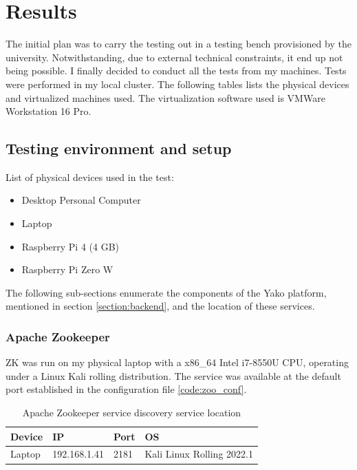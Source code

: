 \section{Results}
    The initial plan was to carry the testing out in a testing bench provisioned by the university. Notwithstanding, due to external technical constraints, it end up not being possible. I finally decided to conduct all the tests from my machines.
    Tests were performed in my local cluster. The following tables lists the physical devices and virtualized machines used. The virtualization software used is VMWare Workstation 16 Pro.
    
    \subsection{Testing environment and setup}
        List of physical devices used in the test:
        
        \begin{itemize}
            \item Desktop Personal Computer
            \item Laptop
            \item Raspberry Pi 4 (4 GB)
            \item Raspberry Pi Zero W
        \end{itemize}
        
        The following sub-sections enumerate the components of the Yako platform, mentioned in section \ref{section:backend}, and the location of these services.
        
        \subsubsection{Apache Zookeeper}
            ZK was run on my physical laptop with a x86\_64 Intel i7-8550U CPU, operating under a Linux Kali rolling distribution. The service was available at the default port established in the configuration file \ref{code:zoo_conf}.
            
            \begin{table}[H]
                \centering
                \caption{Apache Zookeeper service discovery service location}
                \label{tab:test_zk}
                \begin{tabular}{|l|l|l|l|}
                    \hline
                    \rowcolor[HTML]{C0C0C0}
                    \textbf{Device} & \textbf{IP}  & \textbf{Port} & \textbf{OS} \\\hline
                    Laptop & 192.168.1.41 & 2181 & Kali Linux Rolling 2022.1 \\ \hline
                \end{tabular}
            \end{table}
        
